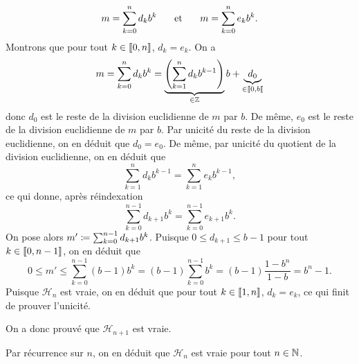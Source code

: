 \documentclass{magnolia}
\begin{document}
\begin{preuve}
\begin{itemize}
\begin{itemize}
\[m=\sum_{k=0}^n d_k b^k \quad\quad\!\text{et}\quad\!\quad m=\sum_{k=0}^n e_k b^k.\]
Montrons que pour tout $k\in\left\llbracket 0,n\right\rrbracket$, $d_k=e_k$. On a
\[m=\sum_{k=0}^{n} d_{k} b^{k} = \underbrace{\left(\sum_{k=1}^n d_k b^{k-1}\right)}_{\in\mathbb{Z}}b + \underbrace{d_0}_{\in\left\llbracket 0,b\right\llbracket}\]
donc $d_0$ est le reste de la division euclidienne de $m$ par $b$. De même, $e_0$ est le reste de la division euclidienne de $m$ par $b$. Par unicité du reste de la division euclidienne, on en déduit que $d_0=e_0$. De même, par unicité du quotient de la division euclidienne, on en déduit que
\[\sum_{k=1}^n d_k b^{k-1}=\sum_{k=1}^n e_k b^{k-1},\]
ce qui donne, après réindexation
\[\sum_{k=0}^{n-1} d_{k+1} b^k=\sum_{k=0}^{n-1} e_{k+1} b^k.\]
On pose alors $m'\coloneqq \sum_{k=0}^{n-1} d_{k+1} b^k$. Puisque $0\leq d_{k+1}\leq b-1$ pour tout $k\in\left\llbracket 0,n-1\right\rrbracket$, on en déduit que
\[0\leq m' \leq \sum_{k=0}^{n-1} (b-1)b^k=(b-1)\sum_{k=0}^{n-1} b^k=(b-1)\frac{1-b^n}{1-b}=b^n-1.\]
Puisque $\mathcal{H}_n$ est vraie, on en déduit que pour tout $k\in\left\llbracket 1,n\right\rrbracket$, $d_k=e_k$, ce qui finit de prouver l'unicité.
\end{itemize}
On a donc prouvé que $\mathcal{H}_{n+1}$ est vraie.
\end{itemize}
Par récurrence sur $n$, on en déduit que $\mathcal{H}_n$ est vraie pour tout $n\in\mathbb{N}$.
\end{preuve}
\end{document}
